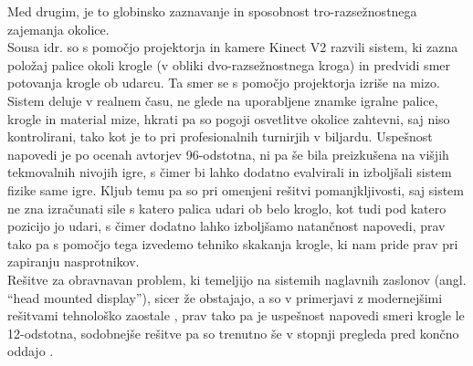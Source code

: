 \documentclass[a4paper, 12pt]{article}
\newcommand\cmnt[1]{\textcolor{munsell}{#1}}
\begin{document}
Med drugim, je to globinsko zaznavanje in sposobnost tro-razsežnostnega zajemanja okolice. \\
Sousa idr. \cite{Sousa2016} so s pomočjo projektorja in kamere Kinect V2 razvili sistem,
ki zazna položaj palice okoli krogle (v obliki dvo-razsežnostnega kroga) in predvidi smer potovanja krogle ob udarcu. Ta smer se s pomočjo projektorja izriše na mizo. Sistem deluje v realnem času, ne glede na uporabljene znamke igralne palice,
krogle in material mize, hkrati pa so pogoji osvetlitve okolice zahtevni, saj niso kontrolirani, tako kot je
to pri profesionalnih turnirjih v biljardu. Uspešnost napovedi je po ocenah avtorjev 96-odstotna, ni pa še bila preizkušena na višjih 
tekmovalnih nivojih igre, s čimer bi lahko dodatno evalvirali in izboljšali sistem fizike same igre. Kljub temu pa so pri omenjeni rešitvi pomanjkljivosti, saj sistem ne zna izračunati sile s katero palica udari ob belo kroglo, kot tudi pod katero pozicijo jo udari, s čimer
dodatno lahko izboljšamo natančnost napovedi, prav tako pa s pomočjo tega izvedemo tehniko skakanja krogle, ki nam pride prav pri zapiranju nasprotnikov. \\
Rešitve za obravnavan problem, ki temeljijo na sistemih naglavnih zaslonov (angl. ``head mounted display''), sicer že obstajajo, a so v primerjavi z modernejšimi rešitvami tehnološko zaostale \cite{Sargaana2005Collaborative}, prav tako pa je uspešnost napovedi smeri krogle le 12-odstotna, sodobnejše rešitve pa so trenutno še v stopnji pregleda pred končno oddajo \cite{Yan2024Enhancing}.


\end{document}
